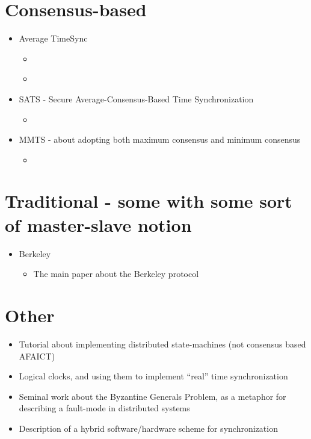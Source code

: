 \documentclass[a4paper,12pt]{article}
\begin{document}
\section{Consensus-based}

\begin{itemize}
\item Average TimeSync
  \begin{itemize}
  \item \cite{SchenatoGamba07}
  \item \cite{LucaFiorentin11}
  \end{itemize}
\end{itemize}

\begin{itemize}
\item SATS - Secure Average-Consensus-Based Time Synchronization
  \begin{itemize}
  \item \cite{HeChengShiChen13}
  \end{itemize}
\end{itemize}


\begin{itemize}
\item MMTS - about adopting both maximum consensus and minimum consensus
  \begin{itemize}
  \item \cite{HeLiChenCheng13}
  \end{itemize}
\end{itemize}

\section{Traditional - some with some sort of master-slave notion}

\begin{itemize}
\item Berkeley
  \begin{itemize}
  \item \cite{Gusella89} The main paper about the Berkeley protocol
  \end{itemize}
\end{itemize}

\section{Other}

\begin{itemize}
\item \cite{Schneider90} Tutorial about implementing distributed state-machines (not consensus based AFAICT)
\item \cite{Lamport78} Logical clocks, and using them to implement ``real'' time synchronization
\item \cite{Lamport82} Seminal work about the Byzantine Generals Problem, as a metaphor for describing a fault-mode in distributed systems
\item \cite{Ramanathan90} Description of a hybrid software/hardware scheme for synchronization
\end{itemize}

\printbibliography
\end{document}
